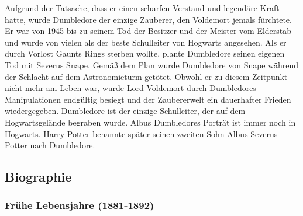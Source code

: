 \documentclass[a4paper, 10pt]{article}
\begin{document}
\vspace{10pt}
\newline
Aufgrund der Tatsache, dass er einen scharfen Verstand und legendäre Kraft hatte, wurde Dumbledore der einzige Zauberer, den Voldemort jemals fürchtete. Er war von 1945 bis zu seinem Tod der Besitzer und der Meister vom Elderstab und wurde von vielen als der beste Schulleiter von Hogwarts angesehen. Als er durch Vorlost Gaunts Rings sterben wollte, plante Dumbledore seinen eigenen Tod mit Severus Snape. Gemäß dem Plan wurde Dumbledore von Snape während der Schlacht auf dem Astronomieturm getötet.
\vspace{10pt}
\newline
Obwohl er zu diesem Zeitpunkt nicht mehr am Leben war, wurde Lord Voldemort durch Dumbledores Manipulationen endgültig besiegt und der Zaubererwelt ein dauerhafter Frieden wiedergegeben. Dumbledore ist der einzige Schulleiter, der auf dem Hogwartsgelände begraben wurde. Albus Dumbledores Porträt ist immer noch in Hogwarts. Harry Potter benannte später seinen zweiten Sohn Albus Severus Potter nach Dumbledore.

\subsection*{\Large Biographie}

\subsubsection*{\large Frühe Lebensjahre (1881-1892)}
\end{document}
